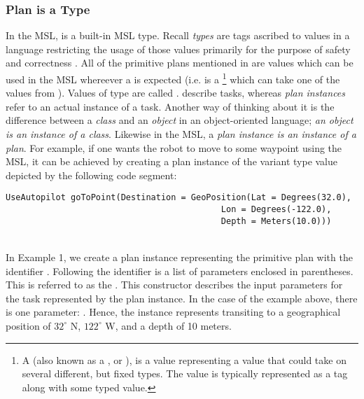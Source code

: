 \subsubsection{Plan is a Type}
In the MSL,  is a built-in MSL type. Recall \textit{types} are tags ascribed to values in a language restricting the usage of those values primarily for the purpose of safety and correctness \citep{pierce:types}.  All of the primitive plans mentioned in  are values which can be used in the MSL whereever a  is expected (i.e.  is a \footnote{A  (also known as a ,  or ), is a value representing a value that could take on several different, but fixed types. The value is typically represented as a tag along with some typed value.} which can take one of the values from ). Values of type  are called .  describe tasks, whereas \textit{plan instances} refer to an actual instance of a task. Another way of thinking about it is the difference between a \textit{class} and an \textit{object} in an object-oriented language;  \textit{an object is an instance of a class}. Likewise in the MSL, a \textit{plan instance is an instance of a plan}. For example, if one wants the robot to move to some waypoint using the MSL, it can be achieved by creating a plan instance of the  variant type value  depicted by the following code segment:

\begin{verbatim}
UseAutopilot goToPoint(Destination = GeoPosition(Lat = Degrees(32.0),
                                           Lon = Degrees(-122.0),
                                           Depth = Meters(10.0)))
\end{verbatim}
\\

In Example 1, we create a plan instance representing the primitive plan  with the identifier . Following the identifier is a list of parameters enclosed in parentheses. This is referred to as the . This constructor describes the input parameters for the task represented by the plan instance. In the case of the example above, there is one parameter: . Hence, the instance  represents transiting to a geographical position of $32^{\circ}$ N, $122^{\circ}$ W, and a depth of 10 meters.

